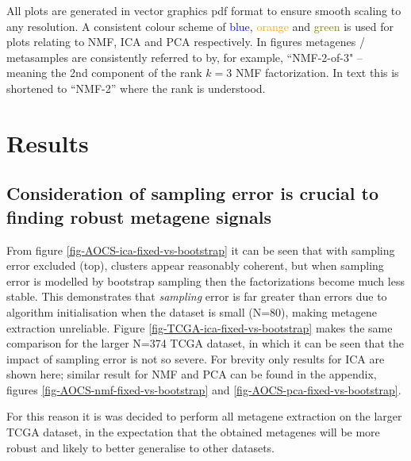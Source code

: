 \documentclass[tikz, 12pt,a4paper,oneside,fleqn]{article}
\begin{document}
All plots are generated in vector graphics pdf format to ensure smooth scaling to any resolution.  A consistent colour scheme of \textcolor{blue}{blue}, \textcolor{orange}{orange} and \textcolor{olive}{green} is used for plots relating to NMF, ICA and PCA respectively.  In figures metagenes / metasamples are consistently referred to by, for example, ``NMF-2-of-3" -- meaning the 2nd component of the rank $k=3$ NMF factorization.  In text this is shortened to ``NMF-2'' where the rank is understood.


\clearpage

\section{Results}


\subsection{Consideration of sampling error is crucial to finding robust metagene signals}

From figure \ref{fig-AOCS-ica-fixed-vs-bootstrap} it can be seen that with sampling error excluded (top), clusters appear reasonably coherent, but when sampling error is modelled by bootstrap sampling then  the factorizations become much less stable.  This demonstrates that \emph{sampling} error is far greater than errors due to algorithm initialisation when the dataset is small (N=80), making metagene extraction unreliable.   Figure  \ref{fig-TCGA-ica-fixed-vs-bootstrap} makes the same comparison for the larger N=374 TCGA dataset, in which it can be seen that the impact of sampling error is not so severe.  For brevity only results for ICA are shown here; similar result for NMF and PCA can be found in the appendix, figures \ref{fig-AOCS-nmf-fixed-vs-bootstrap} and \ref{fig-AOCS-pca-fixed-vs-bootstrap}.

For this reason it is was decided to perform all metagene extraction on the larger TCGA dataset, in the expectation that the obtained metagenes will be more robust and likely to better generalise to other datasets.
\end{document}
